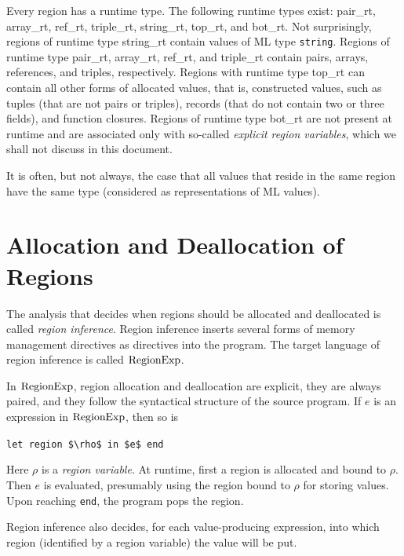 \documentclass[12pt]{book}
\begin{document}
Every region has a
%
%
runtime type. The following runtime types exist: {\sc pair\_rt}, {\sc
  array\_rt}, {\sc ref\_rt}, {\sc triple\_rt}, {\sc string\_rt}, {\sc top\_rt},
and {\sc bot\_rt}. Not surprisingly, regions of runtime type {\sc string\_rt}
contain values of ML type \lstinline{string}. Regions of runtime type {\sc pair\_rt},
{\sc array\_rt}, {\sc ref\_rt}, and {\sc triple\_rt} contain pairs, arrays,
references, and triples, respectively.  Regions with runtime type {\sc top\_rt}
can contain all other forms of allocated values, that is, constructed values,
such as tuples (that are not pairs or triples), records (that do not contain two
or three fields), and function closures. Regions of runtime type {\sc bot\_rt}
are not present at runtime and are associated only with so-called \emph{explicit
region variables}, which we shall not discuss in this document.

It is often, but not always, the case that all values that reside in the same
region have the same type (considered as representations of ML values).

\section{Allocation and Deallocation of Regions}
\label{aldeal.sec}

The analysis that decides when regions should be allocated and deallocated is
called {\em region inference}. Region inference inserts several forms of memory
management directives as directives into the program.  The target language of
region inference is called
%
%
$\hbox{\rm RegionExp}$.

In $\hbox{\rm RegionExp}$, region allocation and deallocation are explicit, they are always
paired, and they follow the syntactical structure of the source program.  If $e$
is an expression in $\hbox{\rm RegionExp}$, then so is%
%
%
\begin{center}
  \lstinline!let region $\rho$ in $e$ end!
\end{center}
Here $\rho$ is a
%
%
{\em region variable}. At runtime, first a region is allocated and bound to
$\rho$. Then $e$ is evaluated, presumably using the region bound to $\rho$ for
storing values. Upon reaching \lstinline{end}, the program pops the region.

Region inference also decides, for each value-producing expression, into which
region (identified by a region variable) the value will be put.
\end{document}
